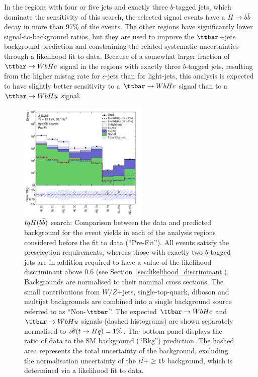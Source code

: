 In the regions with four or five jets and exactly three $b$-tagged jets, which dominate the sensitivity of this search, 
the selected signal events have a $H \to b\bar{b}$ decay in more than 97\% of the events.
The other regions have significantly lower signal-to-background ratios, but they are used to improve 
the $\ttbar$+jets background prediction and constraining the related systematic uncertainties
through a likelihood fit to data.  
Because of a somewhat larger fraction of $\Hc$ signal in the regions with exactly three $b$-tagged jets,
resulting from the higher mistag rate for $c$-jets than for light-jets,
this analysis is expected to have slightly better sensitivity to a $\Hc$ signal than to a $\Hu$ signal.

\begin{figure}[t]
\begin{center}
\includegraphics[width=0.55\textwidth]{figures/Hbb/fit/cH_plots/Summary.pdf}
\caption{$tqH(b\bar{b})$ search: Comparison between the data and predicted background for the event yields in each of the analysis regions considered 
before the fit to data (``Pre-Fit''). All events satisfy the preselection requirements, whereas those with exactly two $b$-tagged jets are
in addition required to have a value of the likelihood discriminant above 0.6 (see Section~\ref{sec:likelihood_discriminant}).
Backgrounds are normalised to their nominal cross sections.
The small contributions from $W/Z$+jets,  single-top-quark, diboson and multijet backgrounds are combined into a single background source 
referred to as ``Non-$\ttbar$''. 
The expected $\Hc$ and $\Hu$ signals (dashed histograms) are shown separately normalised to $\mathscr{B}(t\to Hq)=1\%$.
The bottom panel displays the ratio of data to the SM background (``Bkg'') prediction. 
The hashed area represents the total uncertainty of the background, excluding the normalisation uncertainty of the $t\bar{t}+\geq1b$ background, 
which is determined via a likelihood fit to data.} 
\label{fig:Hbb_Summary}
\end{center}
\end{figure}

